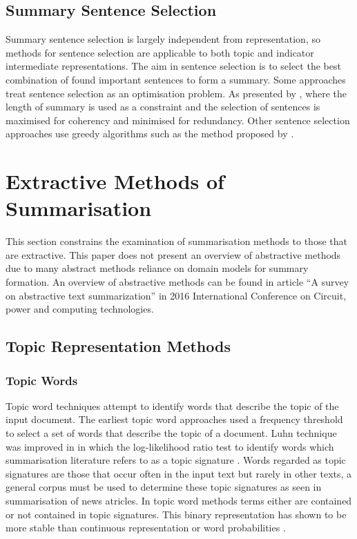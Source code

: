 \subsection{Summary Sentence Selection}
\label{subsec:2.2.3}

Summary sentence selection is largely independent from representation, so methods for sentence selection are applicable to both topic and indicator intermediate representations. The aim in sentence selection is to select the best combination of found important sentences to form a summary. Some approaches treat sentence selection as an optimisation problem. As presented by \citet{alguliev2011mcmr}, where the length of summary is used as a constraint and the selection of sentences is maximised for coherency and minimised for redundancy. Other sentence selection approaches use greedy algorithms such as the method proposed by \citet{li2011generating}.


\section{Extractive Methods of Summarisation}
\label{sec:2.3}
This section constrains the examination of summarisation methods to those that are extractive. This paper does not present an overview of abstractive methods due to many abstract methods reliance on domain models for summary formation. An overview of abstractive methods can be found in \citet{moratanch2016survey} article “A survey on abstractive text summarization” in 2016 International Conference on Circuit, power and computing technologies. 

\subsection{Topic Representation Methods}
\label{subsec:2.3.1}
\subsubsection{Topic Words}

Topic word techniques attempt to identify words that describe the topic of the input document. The earliest topic word approaches \citep{luhn1958automatic} used a frequency threshold to select a set of words that describe the topic of a document. Luhn technique was improved in \citep{dunning1993accurate} in which the log-likelihood ratio test to identify words which summarisation literature refers to as a topic signature \citep{lin2000automated}. Words regarded as topic signatures are those that occur often in the input text but rarely in other texts, a general corpus must be used to determine these topic signatures as seen in \citep{conroy2006topic,harabagiu2005topic} summarisation of news atricles. In topic word methods terms either are contained or not contained in topic signatures. This binary representation has shown to be more stable than continuous representation or word probabilities \citep{gupta2007measuring}.

